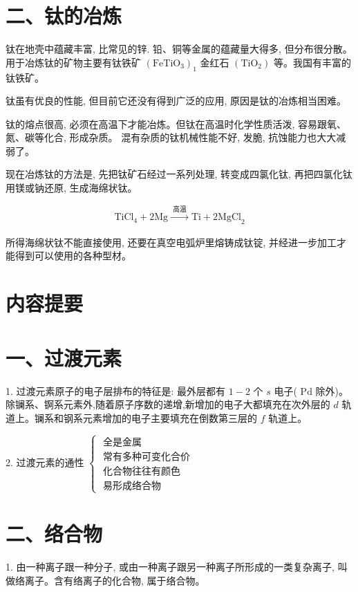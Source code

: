 \documentclass[10pt]{article}
\begin{document}
\section*{二、钛的冶炼}

钛在地壳中蕴藏丰富, 比常见的锌. 铅、铜等金属的蕴藏量大得多, 但分布很分散。用于冶炼钛的矿物主要有钛铁矿 \({\left( {\mathrm{{FeTiO}}}_{3}\right) }_{1}\) 金红石 \(\left( {\mathrm{{TiO}}}_{2}\right)\) 等。我国有丰富的钛铁矿。

钛虽有优良的性能, 但目前它还没有得到广泛的应用, 原因是钛的冶炼相当困难。

钛的熔点很高, 必须在高温下才能冶炼。但钛在高温时化学性质活泼, 容易跟氧、氮、碳等化合, 形成杂质。 混有杂质的钛机械性能不好, 发脆, 抗蚀能力也大大减弱了。

现在冶炼钛的方法是, 先把钛矿石经过一系列处理, 转变成四氯化钛, 再把四氯化钛用镁或钠还原, 生成海绵状钛。

\[
{\mathrm{{TiCl}}}_{4} + 2\mathrm{{Mg}}\xrightarrow[]{\text{ 高温 }}\mathrm{{Ti}} + 2{\mathrm{{MgCl}}}_{2}
\]

所得海绵状钛不能直接使用, 还要在真空电弧炉里熔铸成钛锭, 并经进一步加工才能得到可以使用的各种型材。

\section*{内容提要}

\section*{一、过渡元素}

1. 过渡元素原子的电子层排布的特征是: 最外层都有 \(1 - 2\) 个 \(s\) 电子( \(\mathrm{{Pd}}\) 除外)。除镧系、锕系元素外,随着原子序数的递增,新增加的电子大都填充在次外层的 \(d\) 轨道上。镧系和钢系元素增加的电子主要填充在倒数第三层的 \(f\) 轨道上。

2. 过渡元素的通性 \(\left\{ \begin{array}{l} \text{ 全是金属 } \\ \text{ 常有多种可变化合价 } \\ \text{ 化合物往往有颜色 } \\ \text{ 易形成络合物 } \end{array}\right.\)

\section*{二、络合物}

1. 由一种离子跟一种分子, 或由一种离子跟另一种离子所形成的一类复杂离子, 叫做络离子。含有络离子的化合物, 属于络合物。
\end{document}
